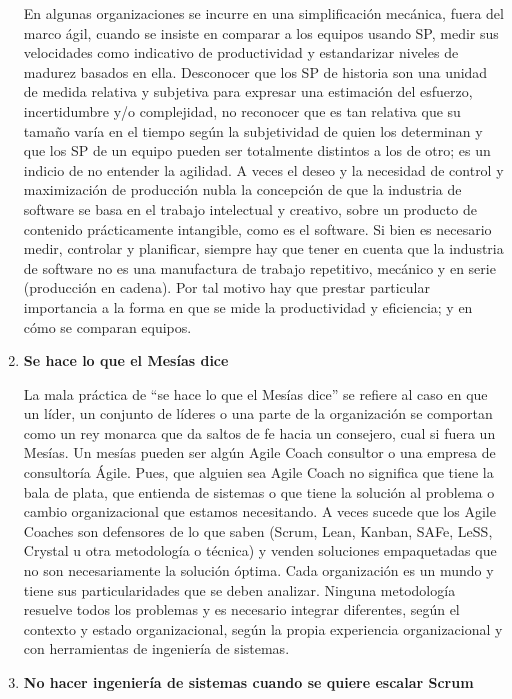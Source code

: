 \begin{enumerate}
En algunas organizaciones se incurre en una simplificación mecánica, fuera del marco ágil, cuando se insiste en comparar a los equipos usando SP, medir sus velocidades como indicativo de productividad y estandarizar niveles de madurez basados en ella. 
Desconocer que los SP de historia son una unidad de medida relativa y subjetiva para expresar una estimación del esfuerzo, incertidumbre y/o complejidad, no reconocer que es tan relativa que su tamaño varía en el tiempo según la subjetividad de quien los determinan y que los SP de un equipo pueden ser totalmente distintos a los de otro; es un indicio de no entender la agilidad. A veces el deseo y la necesidad de control y maximización de producción nubla la concepción de que la industria de software se basa en el trabajo intelectual y creativo, sobre un producto de contenido prácticamente intangible, como es el software. Si bien es necesario medir, controlar y planificar, siempre hay que tener en cuenta que la industria de software no es una manufactura de trabajo repetitivo, mecánico y en serie (producción en cadena). Por tal motivo hay que prestar particular importancia a la forma en que se mide la productividad y eficiencia; y en cómo se comparan equipos.

\item \textbf{Se hace lo que el Mesías dice}

La mala práctica de “se hace lo que el Mesías dice” se refiere al caso en que un líder, un conjunto de líderes o una parte de la organización se comportan como un rey monarca que da saltos de fe hacia un consejero, cual si fuera un Mesías. Un mesías pueden ser algún Agile Coach consultor o una empresa de consultoría Ágile. Pues, que alguien sea Agile Coach no significa que tiene la bala de plata, que entienda de sistemas o que tiene la solución al problema o cambio organizacional que estamos necesitando. A veces sucede que los Agile Coaches son defensores de lo que saben (Scrum, Lean, Kanban, SAFe, LeSS, Crystal u otra metodología o técnica) y venden soluciones empaquetadas que no son necesariamente la solución óptima. Cada organización es un mundo y tiene sus particularidades que se deben analizar. Ninguna metodología resuelve todos los problemas y es necesario integrar diferentes, según el contexto y estado organizacional, según la propia experiencia organizacional y con herramientas de ingeniería de sistemas.

\item \textbf{No hacer ingeniería de sistemas cuando se quiere escalar Scrum}


\end{enumerate}
